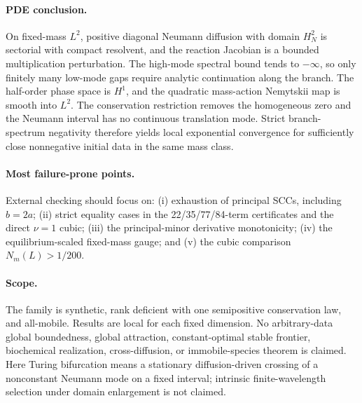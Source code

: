 \documentclass[10pt]{article}
\begin{document}
\paragraph{PDE conclusion.}
On fixed-mass $L^2$, positive diagonal Neumann diffusion with domain $H_N^2$
is sectorial with compact resolvent, and the reaction Jacobian is a bounded
multiplication perturbation.  The high-mode spectral bound tends to
$-\infty$, so only finitely many low-mode gaps require analytic continuation
along the branch.  The half-order phase space is $H^1$, and the quadratic
mass-action Nemytskii map is smooth into $L^2$.  The conservation restriction
removes the homogeneous zero and the Neumann interval has no continuous
translation mode.  Strict branch-spectrum negativity therefore yields local
exponential convergence for sufficiently close nonnegative initial data in
the same mass class.

\paragraph{Most failure-prone points.}
External checking should focus on: (i) exhaustion of principal SCCs, including
$b=2a$; (ii) strict equality cases in the 22/35/77/84-term certificates and
the direct $\nu=1$ cubic; (iii) the principal-minor derivative monotonicity;
(iv) the equilibrium-scaled fixed-mass gauge; and (v) the cubic comparison
$N_m(L)>1/200$.

\paragraph{Scope.}
The family is synthetic, rank deficient with one semipositive conservation law, and all-mobile. Results are local for each fixed dimension. No arbitrary-data global boundedness, global attraction, constant-optimal stable frontier, biochemical realization, cross-diffusion, or immobile-species theorem is claimed.
Here Turing bifurcation means a stationary diffusion-driven crossing of a
nonconstant Neumann mode on a fixed interval; intrinsic finite-wavelength
selection under domain enlargement is not claimed.
\end{document}
